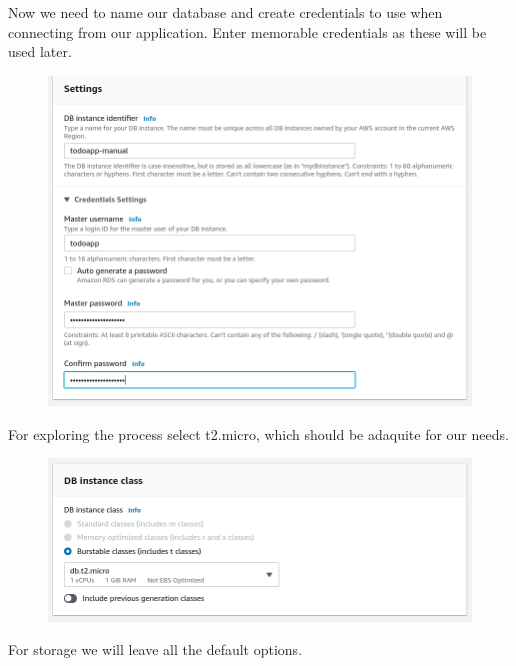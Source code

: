 \documentclass{csse4400}
\begin{document}
Now we need to name our database and create credentials to use when connecting from our application.
Enter memorable credentials as these will be used later.

\begin{figure}[H]
  \includegraphics[width=\textwidth]{images/db3}
\end{figure}

For exploring the process select t2.micro,
which should be adaquite for our needs.


\begin{figure}[H]
  \includegraphics[width=\textwidth]{images/db4}
\end{figure}

For storage we will leave all the default options.
\end{document}
